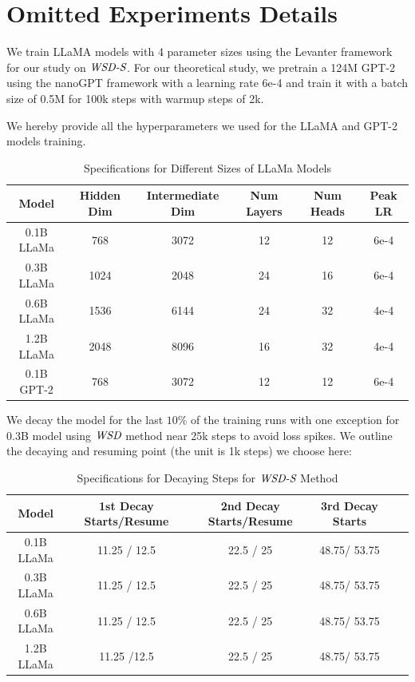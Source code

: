 \section{Omitted Experiments Details}
\label{app:exp}
We train LLaMA models with 4 parameter sizes using the Levanter framework for our study on $\textit{WSD-S}$. For our theoretical study, we pretrain a 124M GPT-2 using the nanoGPT framework with a learning rate 6e-4 and train it with a batch size of 0.5M for 100k steps with warmup steps of 2k. 

We hereby provide all the hyperparameters we used for the LLaMA and GPT-2 models training.

\begin{table}[h!]
\centering
\begin{tabular}{cccccc}
\toprule
\textbf{Model} & \textbf{Hidden Dim} & \textbf{Intermediate Dim} & \textbf{Num Layers} & \textbf{Num Heads} & \textbf{Peak LR} \\
\midrule
0.1B LLaMa & 768 & 3072 & 12 & 12 & 6e-4 \\
0.3B LLaMa & 1024 & 2048 & 24 & 16 & 6e-4 \\
0.6B LLaMa & 1536 & 6144 & 24 & 32 & 4e-4 \\
1.2B LLaMa & 2048 & 8096 & 16 & 32 & 4e-4 \\
0.1B GPT-2 & 768 & 3072 & 12 & 12 & 6e-4 \\
\bottomrule
\end{tabular}
\caption{Specifications for Different Sizes of LLaMa Models}
\label{tab:llama_models}
\end{table}


We decay the model for the last $10\%$ of the training runs with one exception for 0.3B model using $\textit{WSD}$ method near 25k steps to avoid loss spikes. We outline the decaying and resuming point (the unit is 1k steps) we choose here:

\begin{table}[h!]
\centering
\begin{tabular}{cccccc}
\toprule
\textbf{Model} & \textbf{1st Decay Starts/Resume} & \textbf{2nd Decay Starts/Resume} & \textbf{3rd  Decay Starts} \\
\midrule
0.1B LLaMa & 11.25 / 12.5 & 22.5 / 25 & 48.75/ 53.75 \\
0.3B LLaMa & 11.25 / 12.5 & 22.5 / 25 & 48.75/ 53.75 \\
0.6B LLaMa & 11.25 / 12.5 & 22.5 / 25 & 48.75/ 53.75 \\
1.2B LLaMa & 11.25 /12.5 & 22.5 / 25 & 48.75/ 53.75 \\
\bottomrule
\end{tabular}
\caption{Specifications for Decaying Steps for $\textit{WSD-S}$ Method}
\label{tab:llama_models_wsds}
\end{table}

